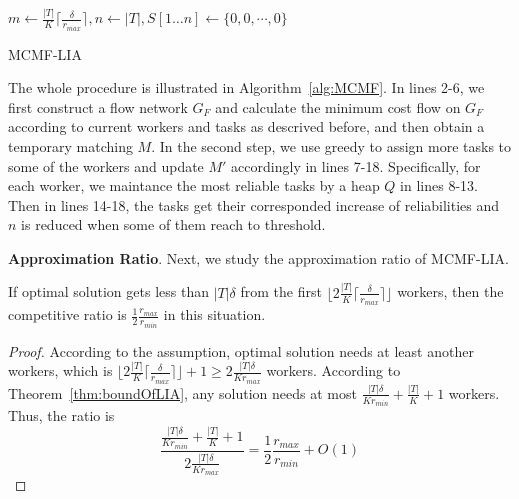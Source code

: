 \begin{algorithm}[t]
	$m \leftarrow \frac{|T|}{K}\lceil \frac{\delta}{r_{max}} \rceil, n \leftarrow |T|, S[1 \ldots n] \leftarrow \{0,0,\cdots,0\}$\;
\caption{MCMF-LIA}
\label{alg:MCMF}
\end{algorithm}

The whole procedure is illustrated in Algorithm~\ref{alg:MCMF}. 
In lines 2-6, we first construct a flow network $G_F$ and calculate
the minimum cost flow on $G_F$ according to current workers and tasks as descrived before, 
and then obtain a temporary matching $M$. 
In the second step, we use greedy to assign more tasks to some of the workers and update $M'$ accordingly
in lines 7-18. Specifically, for each worker, we maintance the most reliable tasks by a heap $Q$ in lines 8-13.
Then in lines 14-18, the tasks get their corresponded increase of reliabilities and $n$ is reduced when some of them reach to threshold. 

\textbf{Approximation Ratio}. 
Next, we study the approximation ratio of MCMF-LIA.

\begin{lemma}
\label{lem:ratioNotFinish}
If optimal solution gets less than $|T|\delta$ from the first $\lfloor 2\frac{|T|}{K}\lceil \frac{\delta}{r_{max}} \rceil \rfloor$ workers,
then the competitive ratio is $\frac{1}{2}\frac{r_{max}}{r_{min}}$ in this situation.
\end{lemma}
\begin{proof}
According to the assumption, optimal solution needs at least another workers,
which is $\lfloor 2\frac{|T|}{K}\lceil \frac{\delta}{r_{max}} \rceil \rfloor + 1 \ge 2\frac{|T|\delta}{Kr_{max}}$ workers.
According to Theorem~\ref{thm:boundOfLIA}, any solution needs at most $\frac{|T|\delta}{Kr_{min}} + \frac{|T|}{K} + 1$ workers.
Thus, the ratio is 
\begin{equation*}
	\frac{\frac{|T|\delta}{Kr_{min}} + \frac{|T|}{K} + 1}{2\frac{|T|\delta}{Kr_{max}}} = \frac{1}{2}\frac{r_{max}}{r_{min}} + O(1)
\end{equation*}
\end{proof}

